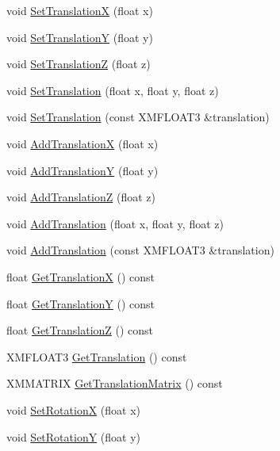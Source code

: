 \begin{DoxyCompactItemize}
void \hyperlink{structmage_1_1_transform_a003d84bc07835f17e8598dceda06d973}{Set\+TranslationX} (float x)
\item 
void \hyperlink{structmage_1_1_transform_ab2c63fbbe2dd2c40d841f8c37df24394}{Set\+TranslationY} (float y)
\item 
void \hyperlink{structmage_1_1_transform_aba982207d2d2d20cae2ba9d8496e8531}{Set\+TranslationZ} (float z)
\item 
void \hyperlink{structmage_1_1_transform_acf702bb57431be2986ca487e07189bda}{Set\+Translation} (float x, float y, float z)
\item 
void \hyperlink{structmage_1_1_transform_ad82e98f98d57cd3e9878336b6c3e804c}{Set\+Translation} (const X\+M\+F\+L\+O\+A\+T3 \&translation)
\item 
void \hyperlink{structmage_1_1_transform_aa4b8469fa07ab4ad3b50aaa34389967f}{Add\+TranslationX} (float x)
\item 
void \hyperlink{structmage_1_1_transform_aef8f3728f6d6d55e69689cff2af4c26f}{Add\+TranslationY} (float y)
\item 
void \hyperlink{structmage_1_1_transform_a0553f72a6fcf38128d2201d54584f079}{Add\+TranslationZ} (float z)
\item 
void \hyperlink{structmage_1_1_transform_a2e981e670eea4d731bda4ee68f0b7fae}{Add\+Translation} (float x, float y, float z)
\item 
void \hyperlink{structmage_1_1_transform_a1125e444c9537e09a328f37a47e61b58}{Add\+Translation} (const X\+M\+F\+L\+O\+A\+T3 \&translation)
\item 
float \hyperlink{structmage_1_1_transform_a171525f6ba157e319646548f2c459395}{Get\+TranslationX} () const
\item 
float \hyperlink{structmage_1_1_transform_a7feba3c1d24a986e440dd6571edc14b2}{Get\+TranslationY} () const
\item 
float \hyperlink{structmage_1_1_transform_a023ce9ea6afaaa80776b4d43957964bf}{Get\+TranslationZ} () const
\item 
X\+M\+F\+L\+O\+A\+T3 \hyperlink{structmage_1_1_transform_aca74308060f244adf137676e79a9f6e5}{Get\+Translation} () const
\item 
X\+M\+M\+A\+T\+R\+IX \hyperlink{structmage_1_1_transform_a4f246a50de8bdfd1bd9dd8e07b7a8c01}{Get\+Translation\+Matrix} () const
\item 
void \hyperlink{structmage_1_1_transform_ae526dabb395eea9481fc072624f6bec4}{Set\+RotationX} (float x)
\item 
void \hyperlink{structmage_1_1_transform_a95c83ba282bf84aeb1c49d9ba8242609}{Set\+RotationY} (float y)

\end{DoxyCompactItemize}
